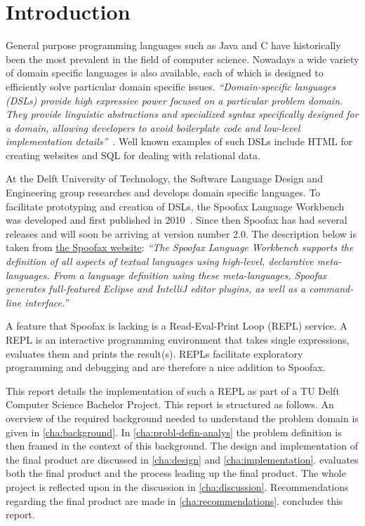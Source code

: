 \chapter{Introduction}
\label{cha:introduction}

General purpose programming languages such as Java and C have historically been
the most prevalent in the field of computer science. Nowadays a wide variety of
domain specific languages is also available, each of which is designed to
efficiently solve particular domain specific issues. \textit{``Domain-specific
languages (DSLs) provide high expressive power focused on a particular problem
domain. They provide linguistic abstractions and specialized syntax
specifically designed for a domain, allowing developers to avoid boilerplate
code and low-level implementation details''}~\cite{Kats10a}. Well known
examples of such DSLs include HTML for creating websites and SQL for dealing
with relational data.

At the Delft University of Technology, the Software Language Design and
Engineering group researches and develops domain specific languages. To
facilitate prototyping and creation of DSLs, the Spoofax Language Workbench was
developed and first published in 2010~\cite{Kats10a}. Since then Spoofax has had
several releases and will soon be arriving at version number 2.0. The
description below is taken from \href{http://spoofax.org}{the Spoofax website}:
\textit{``The Spoofax Language Workbench supports the definition of all aspects
of textual languages using high-level, declarative meta-languages. From a
language definition using these meta-languages, Spoofax generates full-featured
Eclipse and IntelliJ editor plugins, as well as a command-line interface.''}

A feature that Spoofax is lacking is a Read-Eval-Print Loop (REPL) service. A
REPL is an interactive programming environment that takes single expressions,
evaluates them and prints the result(s). REPLs facilitate exploratory
programming and debugging and are therefore a nice addition to Spoofax.

This report details the implementation of such a REPL as part of a
TU Delft Computer Science Bachelor Project. This report is structured as
follows. An overview of the
required background needed to understand the problem domain is given in
\cref{cha:background}. In \cref{cha:probl-defin-analys} the problem definition
is then framed in the context of this background. The design and implementation
of the final product are discussed in \cref{cha:design} and
\cref{cha:implementation}.  evaluates both the
final product and the process leading up the final product. The whole
project is reflected upon in the discussion in \cref{cha:discussion}.
Recommendations regarding the final product are made in
\cref{cha:recommendations}.  concludes this report.

